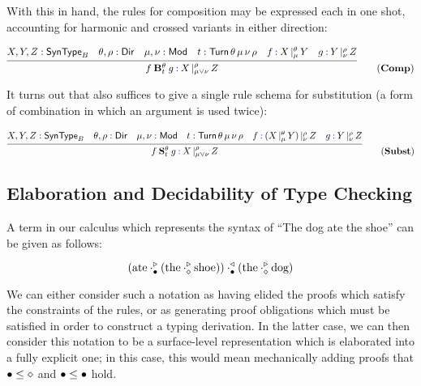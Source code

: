 \documentclass{amsart}
\begin{document}
With this in hand, the rules for composition may be expressed each in
one shot, accounting for harmonic and crossed variants in either
direction:

\begin{equation}
  \infer{f \mathbin{\bf B}_t^\theta g \syn: \arrty X|[\rho,\mu\lor\nu]Z}
  {
    X, Y, Z : \ty{SynType}_B &
    \theta,\rho : \ty{Dir} &
    \mu,\nu : \ty{Mod} &
    t : \ty{Turn}\,\theta\,\mu\,\nu\,\rho &
    f \syn: \arrty X|[\theta,\mu] Y &
    g \syn: \arrty Y|[\rho,\nu] Z
  }\tag{$\mathbf{Comp}$}
\end{equation}

It turns out that  also suffices to give a single rule schema
for substitution (a form of combination in which an argument is used
twice):

\begin{equation}
  \infer{f \mathbin{\bf S}_t^\theta g \syn: \arrty X|[\rho,\mu\lor\nu]Z}
  {
    X, Y, Z : \ty{SynType}_B &
    \theta,\rho : \ty{Dir} &
    \mu,\nu : \ty{Mod} &
    t : \ty{Turn}\,\theta\,\mu\,\nu\,\rho &
    f \syn: \arrty {(\arrty X|[\theta,\mu]Y)} |[ \rho,\nu] Z &
    g \syn: \arrty Y|[\rho,\nu]Z
  }\tag{$\mathbf{Subst}$}
\end{equation}

\subsection{Elaboration and Decidability of Type Checking}

A term in our calculus which represents the syntax of ``The dog ate the
shoe'' can be given as follows:

\begin{equation}\label{eq:dog-ate-shoe}
  (\text{ate} \cdot^\triangleright_{\mathsf{\bullet}} (\text{the} \cdot^\triangleright_{\mathsf{\diamond}}
\text{shoe})) \cdot^\triangleleft_{\mathsf{\bullet}} (\text{the} \cdot^\triangleright_{\mathsf{\diamond}}
\text{dog})
\end{equation}

We can either consider such a notation as having elided the proofs which
satisfy the constraints of the rules, or as generating proof obligations
which must be satisfied in order to construct a typing derivation. In
the latter case, we can then consider this notation to be a
surface-level representation which is elaborated into a fully explicit
one; in this case, this would mean mechanically adding proofs that
$\mathsf{\bullet}\leq\mathsf{\diamond}$ and $\mathsf{\bullet}\leq\mathsf{\bullet}$ hold.
\end{document}

